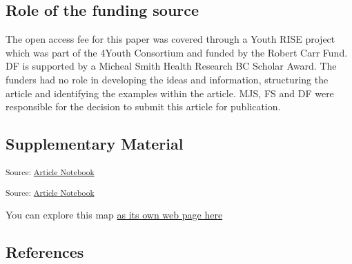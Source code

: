 \documentclass[
  letterpaper,
  DIV=11,
  numbers=noendperiod]{scrartcl}
\begin{document}
\subsection{Role of the funding
source}\label{role-of-the-funding-source}

The open access fee for this paper was covered through a Youth RISE
project which was part of the 4Youth Consortium and funded by the Robert
Carr Fund. DF is supported by a Micheal Smith Health Research BC Scholar
Award. The funders had no role in developing the ideas and information,
structuring the article and identifying the examples within the article.
MJS, FS and DF were responsible for the decision to submit this article
for publication.

\subsection{Supplementary Material}\label{sec-supp-material}

\textsubscript{Source:
\href{https://mx-jx.github.io/YPWUD/index-preview.html}{Article
Notebook}}

\textsubscript{Source:
\href{https://mx-jx.github.io/YPWUD/index-preview.html}{Article
Notebook}}

You can explore this map \href{map.html}{as its own web page here}

\pagebreak

\subsection{References}\label{references}

\singlespacing

\pagebreak
\end{document}
